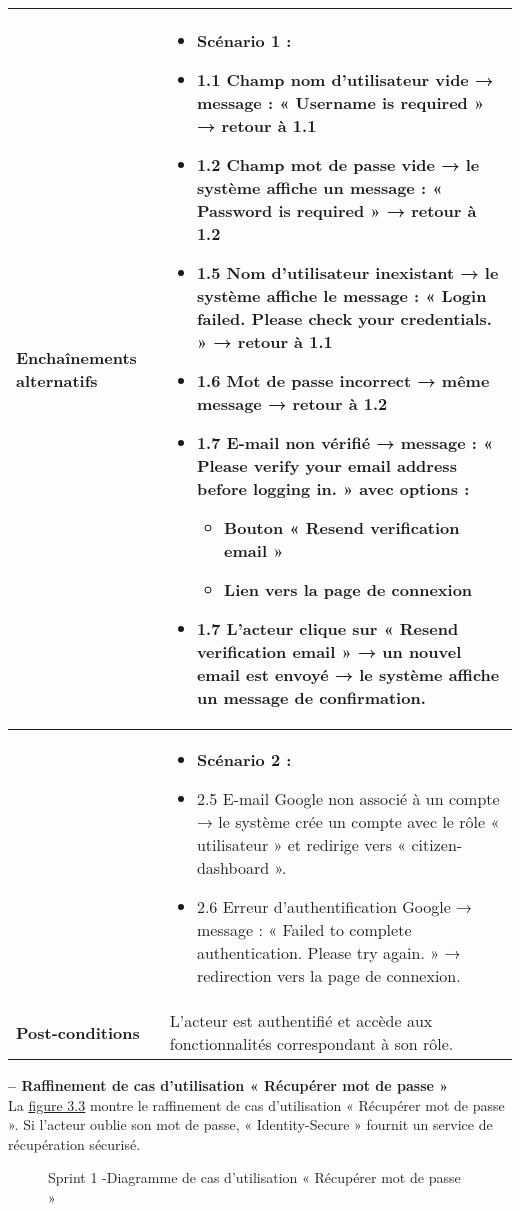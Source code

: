 \begin{longtable}{|>{\arraybackslash}p{4.2cm}|>{\arraybackslash}p{12.5cm}|}
\textbf{Enchaînements alternatifs} &
\begin{itemize}[label=]
  \item \textbf{Scénario 1 :}
    \item 1.1 Champ nom d'utilisateur vide → message : « Username is required » → retour à 1.1
    \item 1.2 Champ mot de passe vide → le système affiche un message : « Password is required » → retour à 1.2
    \item 1.5 Nom d'utilisateur inexistant → le système affiche le message : « Login failed. Please check your credentials. » → retour à 1.1
    \item 1.6 Mot de passe incorrect → même message → retour à 1.2
    \item 1.7 E-mail non vérifié → message : « Please verify your email address before logging in. » avec options :
    \begin{itemize}[label=]
      \item Bouton « Resend verification email »
      \item Lien vers la page de connexion
    \end{itemize}
    \item 1.7 L'acteur clique sur « Resend verification email » → un nouvel email est envoyé → le système affiche un message de confirmation.

\end{itemize} \\
\hline
\textbf{}{}&
\begin{itemize}[label=]
\item \textbf{Scénario 2 :}
    \item 2.5 E-mail Google non associé à un compte → le système crée un compte avec le rôle « utilisateur » et redirige vers « citizen-dashboard ».
    \item 2.6 Erreur d'authentification Google → message : « Failed to complete authentication. Please try again. » → redirection vers la page de connexion.
\end{itemize}\\
\hline
\textbf{Post-conditions} & L'acteur est authentifié et accède aux fonctionnalités correspondant à son rôle. \\
\hline
\end{longtable}


\vspace{1 cm}


\textbf{ – Raffinement de cas d'utilisation « Récupérer mot de passe »}
\\
La \hyperref[fig:3.3]{figure 3.3} montre le raffinement de cas d'utilisation « Récupérer mot de passe ». Si l'acteur oublie son mot de
passe, « Identity-Secure » fournit un service de récupération sécurisé.
\begin{figure}[H]
\centering
{}
\caption{ Sprint 1 -Diagramme de cas d'utilisation « Récupérer mot de passe »
}
\label{fig:3.3}
\end{figure}

